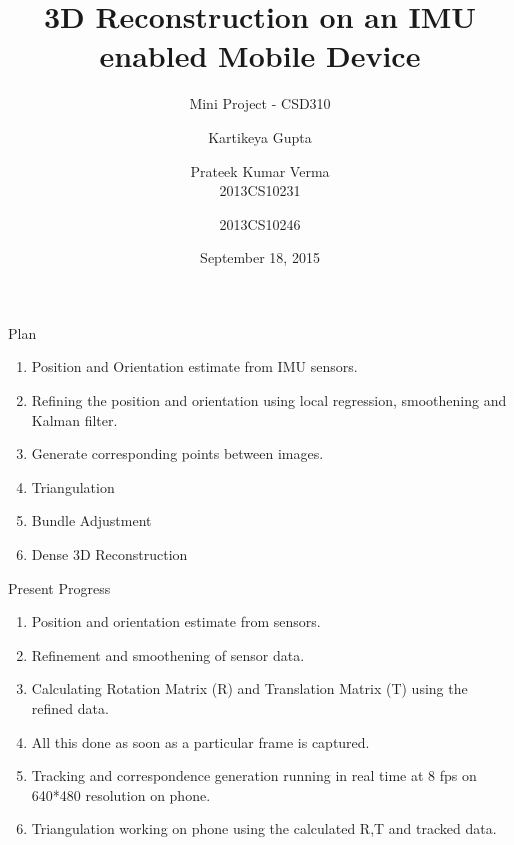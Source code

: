 \documentclass{beamer}
\title[3D reconstruction]{3D Reconstruction on an IMU enabled Mobile Device}
\subtitle{Mini Project - CSD310}
\author[Kartikeya \and Prateek]{\hspace{.063\textwidth} Kartikeya Gupta \and Prateek Kumar Verma \\\small 2013CS10231 \hspace{.1\textwidth} \and \small 2013CS10246}
\institute[IITD] %
{
  Department of Computer Science and Engineering\\
  IIT Delhi
  \and
  Under supervision of \\
  \textbf{Prof. Subhashis Banerjee} \\
  Department of Computer Science and Engineering
}
\date{September 18, 2015}
\begin{document}
\begin{frame}
  \titlepage
\end{frame}




\begin{frame}{Plan}{}
  \begin{enumerate}
  	\item Position and Orientation estimate from IMU sensors.
  	\item Refining the position and orientation using local regression, smoothening and Kalman filter.
  	\item Generate corresponding points between images.
  	\item Triangulation
  	\item Bundle Adjustment
  	\item Dense 3D Reconstruction
  \end{enumerate}
\end{frame}

\begin{frame}{Present Progress}{}
	\begin{enumerate}
		\item Position and orientation estimate from sensors.
    \item Refinement and smoothening of sensor data. 
    \item Calculating Rotation Matrix (R) and Translation Matrix (T) using the refined data.
    \item All this done as soon as a particular frame is captured.
		\item Tracking and correspondence generation running in real time at 8 fps on 640*480 resolution on phone.
		\item Triangulation working on phone using the calculated R,T and tracked data.
	\end{enumerate}
\end{frame}
\end{document}
